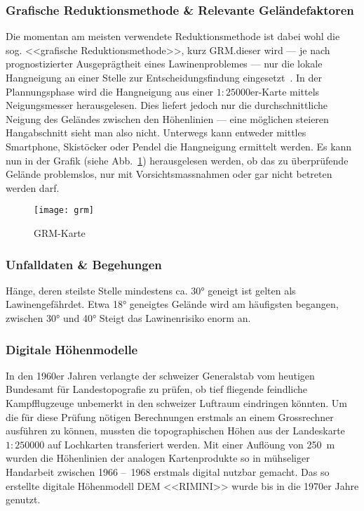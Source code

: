 \begin{multicols}{2}
\subsubsection{Grafische Reduktionsmethode \& Relevante Geländefaktoren}

Die momentan am meisten verwendete Reduktionsmethode ist dabei wohl die sog. <<grafische Reduktionsmethode>>, kurz GRM.\@Bei dieser wird --- je nach prognostizierter Ausgeprägtheit eines Lawinenproblemes --- nur die lokale Hangneigung an einer Stelle zur Entscheidungsfindung eingesetzt~\cite{sacbergspwinter}. In der Plannungsphase wird die Hangneigung aus einer $1:25000$er-Karte mittels Neigungsmesser herausgelesen. Dies liefert jedoch nur die durchschnittliche Neigung des Geländes zwischen den Höhenlinien --- eine möglichen steieren Hangabschnitt sieht man also nicht.
Unterwegs kann entweder mittles Smartphone, Skistöcker oder Pendel die Hangneigung ermittelt werden. Es kann nun in der Grafik (siehe Abb.\ \ref{fig:grm}) herausgelesen werden, ob das zu überprüfende Gelände problemslos, nur mit Vorsichtsmassnahmen oder gar nicht betreten werden darf.

\begin{figure}[H]
  \centering
  \texttt{[image: grm]}
  \caption{GRM-Karte~\cite{achtunglawine}}\label{fig:grm}
\end{figure}



\subsubsection{Unfalldaten \& Begehungen}

Hänge, deren steilste Stelle mindestens ca. 30° geneigt ist gelten als Lawinengefährdet. Etwa 18° geneigtes Gelände wird am häufigsten begangen, zwischen 30° und 40° Steigt das Lawinenrisiko enorm an.~\cite{sacbergspwinterp99} 






\subsubsection{Digitale Höhenmodelle}\label{sec:dem}

In den 1960er Jahren verlangte der schweizer Generalstab vom heutigen Bundesamt für Landestopografie zu prüfen, ob tief fliegende feindliche Kampfflugzeuge unbemerkt in den schweizer Luftraum eindringen könnten. Um die für diese Prüfung nötigen Berechnungen erstmals an einem Grossrechner ausführen zu können, mussten die topographischen Höhen aus der Landeskarte $1:250000$ auf Lochkarten transferiert werden. Mit einer Auflöung von \qty{250}{m} wurden die Höhenlinien der analogen Kartenprodukte so in mühseliger Handarbeit zwischen 1966 --~1968 erstmals digital nutzbar gemacht. Das so erstellte digitale Höhenmodell DEM <<RIMINI>> wurde bis in die 1970er Jahre genutzt.~\cite{swisstopohistdem}


\end{multicols}
